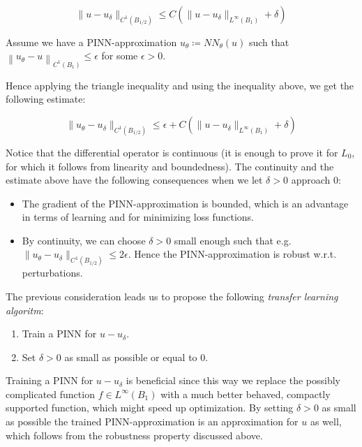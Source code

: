 \documentclass[letterpaper,12pt]{article}
\begin{document}
\begin{equation*}
\|u-u_{\delta}\|_{C^{1}\left(B_{1 / 2}\right)} \leq C\left(\|u-u_{\delta}\|_{L^{\infty}\left(B_{1}\right)}+\delta\right)
\end{equation*}

Assume we have a PINN-approximation $u_{\theta}\coloneqq N\!N_{\theta}(u)$ such that
$\left\|u_{\theta}-u\right\|_{C^{1}\left(B_{1}\right)} \leq \epsilon$ for some $\epsilon>0$.

Hence applying the triangle inequality and using the inequality above, we get the following estimate:

\begin{equation*}
\|u_{\theta}-u_{\delta}\|_{C^{1}\left(B_{1 / 2}\right)} \leq\epsilon + C\left(\|u-u_{\delta}\|_{L^{\infty}\left(B_{1}\right)}+\delta\right)
\end{equation*} 

Notice that the differential operator is continuous (it is enough to prove it for $L_0$, for which it follows from linearity and boundedness). The continuity and the estimate above have the following consequences when we let $\delta>0$ approach $0$:
\begin{itemize}
  	\item The gradient of the PINN-approximation is bounded, which is an advantage in terms of learning and for minimizing loss functions.
	\item  By continuity, we can choose $\delta>0$ small enough such that e.g. 
		$\|u_{\theta}-u_{\delta}\|_{C^{1}\left(B_{1 / 2}\right)} \leq 2\epsilon.$ Hence the PINN-approximation is robust w.r.t. perturbations.
\end{itemize}

The previous consideration leads us to propose the following \textit{transfer learning algoritm}:
\begin{enumerate}
	\setlength\itemsep{-0.2em}
  	\item	Train a PINN for $u-u_{\delta}$.
	\item	Set $\delta>0$ as small as possible or equal to  $0$.
\end{enumerate}

Training a PINN for $u-u_{\delta}$ is beneficial since this way we replace the possibly complicated function 
$f\in L^{\infty}\left(B_{1}\right)$ with a much better behaved, compactly supported function, which might speed up optimization. By setting  $\delta>0$ as small as possible the trained PINN-approximation is an approximation for $u$ as well, which follows from the robustness property discussed above.
\end{document}
